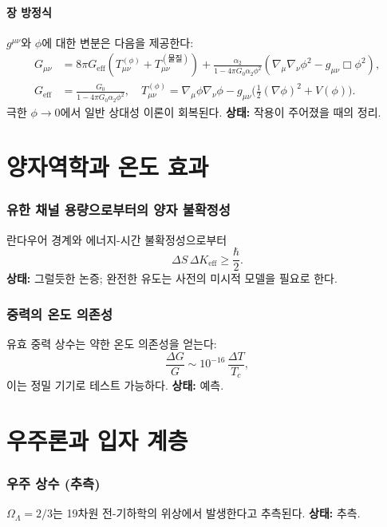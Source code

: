 \documentclass[11pt,a4paper]{article}
\begin{document}
	\subsection{장 방정식}
	\(g^{\mu\nu}\)와 \(\phi\)에 대한 변분은 다음을 제공한다:
	\begin{align}
		G_{\mu\nu} &= 8\pi G_{\mathrm{eff}}\left(T_{\mu\nu}^{(\phi)} + T_{\mu\nu}^{(\text{물질})}\right) + \frac{\alpha_2}{1-4\pi G_0\alpha_2\phi^2}\left(\nabla_\mu\nabla_\nu\phi^2 - g_{\mu\nu}\Box\phi^2\right), \label{eq:einstein-mod} \\
		G_{\mathrm{eff}} &= \frac{G_0}{1-4\pi G_0\alpha_2\phi^2},\quad
		T_{\mu\nu}^{(\phi)} = \nabla_\mu\phi\nabla_\nu\phi - g_{\mu\nu}\bigl(\tfrac12(\nabla\phi)^2 + V(\phi)\bigr).
	\end{align}
	극한 \(\phi\to0\)에서 일반 상대성 이론이 회복된다. \textbf{상태:} 작용이 주어졌을 때의 정리.
	
	\part{양자역학과 온도 효과}
	
	\section{유한 채널 용량으로부터의 양자 불확정성}
	란다우어 경계와 에너지-시간 불확정성으로부터
	\[
	\Delta S \, \Delta K_{\mathrm{eff}} \ge \frac{\hbar}{2}.
	\]
	\textbf{상태:} 그럴듯한 논증; 완전한 유도는 사전의 미시적 모델을 필요로 한다.
	
	\section{중력의 온도 의존성}
	\label{sec:temperature}
	유효 중력 상수는 약한 온도 의존성을 얻는다:
	\[
	\frac{\Delta G}{G} \sim 10^{-16}\,\frac{\Delta T}{T_c},
	\]
	이는 정밀 기기로 테스트 가능하다. \textbf{상태:} 예측.
	
	\part{우주론과 입자 계층}
	
	\section{우주 상수 (추측)}
	\label{sec:Lambda}
	\(\Omega_\Lambda = 2/3\)는 19차원 전-기하학의 위상에서 발생한다고 추측된다. \textbf{상태:} 추측.
	
\end{document}
